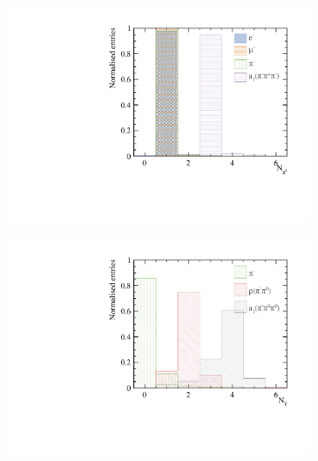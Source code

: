 



\begin{figure}[htbp]
\centering
\begin{subfigure}[b]{0.45\textwidth}
 \includegraphics[width=\textwidth]{tau/var2/nCharge_100GeV_improved.pdf}
  \caption{}
  \label{fig:tauVarNCharge}
\end{subfigure}
\begin{subfigure}[b]{0.45\textwidth}
 \includegraphics[width=\textwidth]{tau/var2/nPhoton_100GeV_improved.pdf}

\end{subfigure}
\end{figure}
